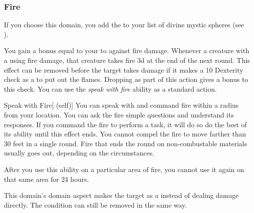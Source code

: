         \subsubsection{Fire}
            If you choose this domain, you add the   to your list of divine mystic spheres (see ).

             You gain a bonus equal to your  to  against fire damage.
             Whenever  a creature with a  using fire damage, that creature takes fire  \minus3d at the end of the next round.
            This effect can be removed before the target takes damage if it makes a  10 Dexterity check as a  to put out the flames.
            Dropping  as part of this action gives a  bonus to this check.
             You can use the \textit{speak with fire} ability as a standard action.
            \begin{attuneability}{Speak with Fire}[ (self)]
                You can speak with and command fire within a \areahuge radius  from your location.
                You can ask the fire simple questions and understand its responses.
                If you command the fire to perform a task, it will do so do the best of its ability until this effect ends.
                You cannot compel the fire to move farther than 30 feet in a single round.
                Fire that ends the round on non-combustable materials usually goes out, depending on the circumstances.

                After you use this ability on a particular area of fire, you cannot use it again on that same area for 24 hours.
            \end{attuneability}
             This domain's domain aspect makes the target  as a  instead of dealing damage directly.
            The condition can still be removed in the same way.

